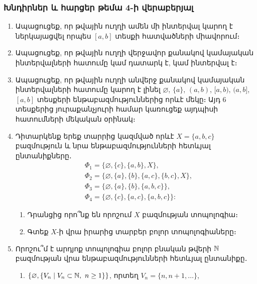 \bigskip
\bigskip
\subsubsection*{Խնդիրներ և հարցեր թեմա 4-ի վերաբերյալ}

\begin{enumerate}[label=\thesection.\arabic*.]
    \item Ապացուցեք, որ թվային ուղղի ամեն մի ինտերվալ կարող է ներկայացվել որպես $[a, b]$ տեսքի հատվածների միավորում։
    
    \item Ապացուցեք, որ թվային ուղղի վերջավոր քանակով կամայական ինտերվալ\-ների հատումը կամ դատարկ է, կամ ինտերվալ է։
    
    \item Ապացուցեք, որ թվային ուղղի անվերջ քանակով կամայական ինտերվալների հատումը կարող է լինել $ \varnothing$, $\{a\}$,  $(a,b)$, $[a,b)$, $(a,b]$, $[a,b]$ տեսքերի ենթաբազմու\-թյուններից որևէ մեկը։ Այդ 6 տեսքերից յուրաքանչյուրի համար կառուցեք այդ\-պիսի հատումների մեկական օրինակ։
    
    \item Դիտարկենք երեք տարրից կազմված որևէ $X=\{a,b,c\}$ բազմություն և նրա ենթաբազմությունների հետևյալ ընտանիքները․
    \begin{align*}
    &\Phi_1 = \{ \varnothing, \{c\}, \{a,b\},X \}, \\
    &\Phi_2 = \{ \varnothing, \{a\}, \{b\},\{a,c\},\{b,c\},X \}, \\ 
    &\Phi_3 = \{ \varnothing, \{a\}, \{b\},\{a,b,c\}\},\\ &\Phi_4 = \{ \varnothing, \{c\}, \{a,c\},\{a,b,c\} \}:
    \end{align*}

    \begin{enumerate}
        \item[ա)] Դրանցից որո՞նք են որոշում $X$ բազմության տոպոլոգիա։
        
        \item[բ)] Գտեք $X$-ի վրա իրարից տարբեր բոլոր տոպոլոգիաները։
    \end{enumerate}


    \item Որոշու՞մ է արդյոք տոպոլոգիա բոլոր բնական թվերի $\mathbb{N}$ բազմության վրա ենթաբազմությունների հետևյալ ընտանիքը․
        \begin{enumerate}
        \item[ա)] $\{\varnothing, \{V_n \mid V_n \subset \mathbb{N},\ n \geq 1\}\}$, որտեղ $V_n=\{n,n+1,\dots\}$,
        

\end{enumerate}
\end{enumerate}
